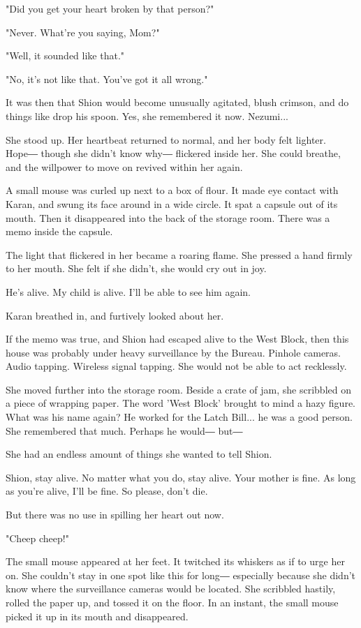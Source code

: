 "Did you get your heart broken by that person?"

"Never. What're you saying, Mom?"

"Well, it sounded like that."

"No, it's not like that. You've got it all wrong."

It was then that Shion would become unusually agitated, blush crimson,
and do things like drop his spoon. Yes, she remembered it now. Nezumi...

She stood up. Her heartbeat returned to normal, and her body felt
lighter. Hope― though she didn't know why― flickered inside her. She
could breathe, and the willpower to move on revived within her again.

A small mouse was curled up next to a box of flour. It made eye contact
with Karan, and swung its face around in a wide circle. It spat a
capsule out of its mouth. Then it disappeared into the back of the
storage room. There was a memo inside the capsule.

The light that flickered in her became a roaring flame. She pressed a
hand firmly to her mouth. She felt if she didn't, she would cry out in
joy.

He's alive. My child is alive. I'll be able to see him again.

Karan breathed in, and furtively looked about her.

If the memo was true, and Shion had escaped alive to the West Block,
then this house was probably under heavy surveillance by the Bureau.
Pinhole cameras. Audio tapping. Wireless signal tapping. She would not
be able to act recklessly.

She moved further into the storage room. Beside a crate of jam, she
scribbled on a piece of wrapping paper. The word 'West Block' brought to
mind a hazy figure. What was his name again? He worked for the Latch
Bill... he was a good person. She remembered that much. Perhaps he
would― but―

She had an endless amount of things she wanted to tell Shion.

Shion, stay alive. No matter what you do, stay alive. Your mother is
fine. As long as you're alive, I'll be fine. So please, don't die.

But there was no use in spilling her heart out now.

"Cheep cheep!"

The small mouse appeared at her feet. It twitched its whiskers as if to
urge her on. She couldn't stay in one spot like this for long―
especially because she didn't know where the surveillance cameras would
be located. She scribbled hastily, rolled the paper up, and tossed it on
the floor. In an instant, the small mouse picked it up in its mouth and
disappeared.

